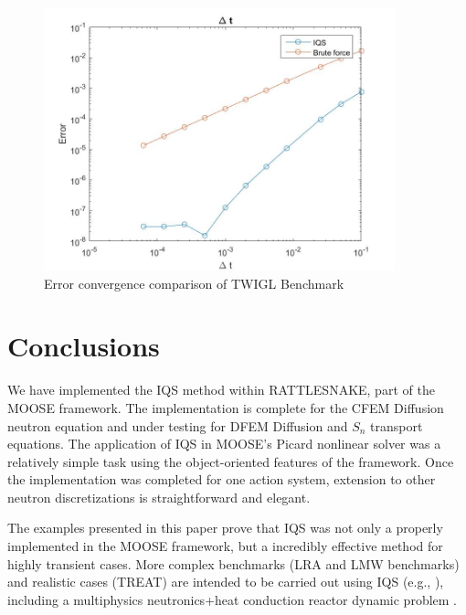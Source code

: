 \documentclass[12pt]{article}
\begin{document}
\begin{figure}[!htbp]
\centering
\includegraphics[width=4in]{figures/TWIGL_convergence.jpg}
\caption{Error convergence comparison of TWIGL Benchmark}
\label{fig:TWIGL_conv}
\end{figure}

\section{Conclusions} 
\label{sect::ccl}

We have implemented the IQS method within RATTLESNAKE, part of the MOOSE framework. The implementation is complete for the CFEM Diffusion neutron equation and under testing for
DFEM Diffusion and $S_n$ transport equations. The application of IQS in MOOSE's Picard nonlinear solver was a relatively simple task using the object-oriented features of the framework. Once the implementation was completed for one action system, extension to other neutron discretizations is straightforward and elegant.  

The examples presented in this paper prove that IQS was not only a properly implemented in the MOOSE framework, but a incredibly effective method for highly transient cases.  More complex benchmarks (LRA and LMW benchmarks) and realistic cases (TREAT) are intended to be carried out using IQS (e.g., \cite{Yasinsky_1965, LMW_benchmark}), including a multiphysics neutronics+heat conduction reactor dynamic problem \cite{ANL_BPB}.

%


\end{document}
